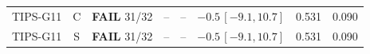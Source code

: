 \begin{longtable}{lcp{37mm}rrp{37mm}rr}
TIPS-G11 & C & \textbf{FAIL} 31/32 & -- & -- & \(-0.5\,[-9.1,10.7]\) & 0.531 & 0.090\\
TIPS-G11 & S & \textbf{FAIL} 31/32 & -- & -- & \(-0.5\,[-9.1,10.7]\) & 0.531 & 0.090\\

\end{longtable}
